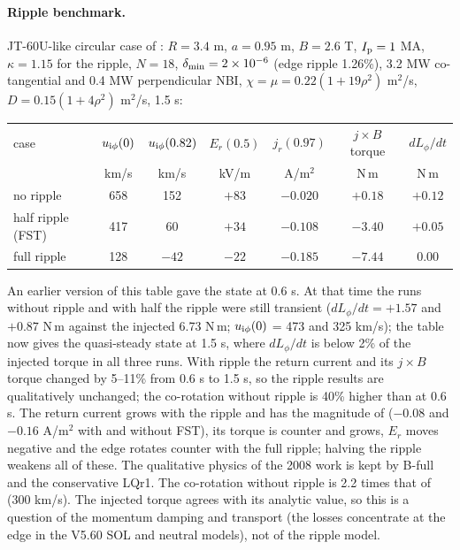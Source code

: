 \documentclass[11pt]{article}
\def\r#1{{\rm#1}}
\begin{document}
\paragraph{Ripple benchmark.}  JT-60U-like circular case of \cite{NF2008}: $R=3.4$ m,
$a=0.95$ m, $B=2.6$ T, $I_\r{p}=1$ MA, $\kappa=1.15$ for the ripple, $N=18$,
$\delta_\r{min}=2\times10^{-6}$ (edge ripple 1.26\%), 3.2 MW co-tangential and 0.4 MW
perpendicular NBI, $\chi = \mu = 0.22(1+19\rho^2)$ m$^2$/s, $D = 0.15(1+4\rho^2)$ m$^2$/s,
1.5 s:
\begin{center}
\begin{tabular}{|l|c|c|c|c|c|c|}\hline
case & $u_{\r{i}\phi}(0)$ & $u_{\r{i}\phi}(0.82)$ & $E_r(0.5)$ & $j_r(0.97)$ & $j\times B$ torque & $dL_\phi/dt$ \\
 & km/s & km/s & kV/m & A/m$^2$ & N\,m & N\,m \\\hline
no ripple & 658 & 152 & $+83$ & $-0.020$ & $+0.18$ & $+0.12$ \\
half ripple (FST) & 417 & 60 & $+34$ & $-0.108$ & $-3.40$ & $+0.05$ \\
full ripple & 128 & $-42$ & $-22$ & $-0.185$ & $-7.44$ & $0.00$ \\\hline
\end{tabular}
\end{center}
An earlier version of this table gave the state at 0.6 s.  At that time the runs
without ripple and with half the ripple were still transient ($dL_\phi/dt = +1.57$
and $+0.87$ N\,m against the injected 6.73 N\,m; $u_{\r{i}\phi}(0)$ = 473 and
325 km/s); the table now gives the quasi-steady state at 1.5 s, where
$dL_\phi/dt$ is below 2\% of the injected torque in all three runs.  With ripple
the return current and its $j\times B$ torque changed by 5--11\% from 0.6 s to 1.5 s,
so the ripple results are qualitatively unchanged; the co-rotation without ripple
is 40\% higher than at 0.6 s.
The return current grows with the ripple and has the magnitude of \cite{NF2008}
($-0.08$ and $-0.16$ A/m$^2$ with and without FST), its torque is counter and
grows, $E_r$ moves negative and the edge rotates counter with the full ripple;
halving the ripple weakens all of these.  The qualitative physics of the 2008
work is kept by B-full and the conservative LQr1.  The co-rotation without ripple
is 2.2 times that of \cite{NF2008} (300 km/s).  The injected torque agrees with
its analytic value, so this is a question of the momentum damping and transport
(the losses concentrate at the edge in the V5.60 SOL and neutral models), not of
the ripple model.
\end{document}
